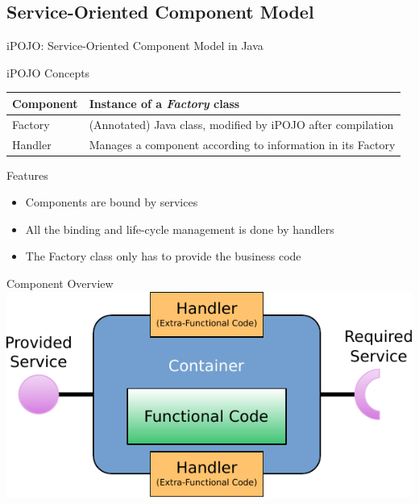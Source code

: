 \subsection{Service-Oriented Component Model}

\begin{frame}{iPOJO: Service-Oriented Component Model in Java}
\begin{block}{iPOJO Concepts}
\begin{tabular}{lp{}}
Component & Instance of a \textit{Factory} class\\
\hline
Factory & (Annotated) Java class, modified by iPOJO after compilation\\
\hline
Handler & Manages a component according to information in its Factory\\
\end{tabular}
\end{block}

\begin{block}{Features}
\begin{itemize}
\item Components are bound by services
\item All the binding and life-cycle management is done by handlers
\item The Factory class only has to provide the business code
\end{itemize}
\end{block}
\end{frame}

\begin{frame}{Component Overview}
\centering
\includegraphics[width=\textwidth]{../imgs/cbse_component}
\end{frame}

